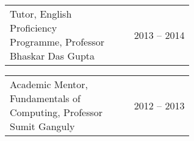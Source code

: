 \documentclass[a4paper]{article} %
\newcommand{\verticalspacing}{-0.25cm}
\newcommand{\headspace}{-0.3cm}
\newcommand{\bulletspace}{0.7cm}
\newcommand{\projectheadspacing}{6.9cm}
\newcommand{\cproject}[5]{%
    \begin{tabular}{p{0.60\linewidth}r}
        \textcolor{NavyBlue}{\small #2} & \multicolumn{1}{m{ \projectheadspacing{} }}{\raggedleft \small {\textsc{#1}}}\\
        \small {#3} & \small {#4}
    \end{tabular}\\
    \begin{tabular}{p{0.98\linewidth}}
    \vspace{-0.3cm}
        \small{#5}
    \end{tabular}
    \vspace{\verticalspacing{}}
}
\newcommand{\gitproject}[3]{%
    \begin{tabular}{p{0.60\linewidth}r}
        \textcolor{NavyBlue}{\small #2} & \multicolumn{1}{m{ \projectheadspacing{} }}{\raggedleft #1}\\
    \end{tabular}\\
    \begin{tabular}{p{0.98\linewidth}}
        \vspace{\headspace{}}
        \small{#3}
    \end{tabular}
    \vspace{\verticalspacing{}}
    \vspace{-0.2cm} %
}
\newcommand{\skill}[2]{%
    \begin{tabular}{p{0.60\linewidth}r}
        \small {#2} & \multicolumn{1}{m{ \projectheadspacing{} }}{\raggedleft \textsc{\small #1}}\\
    \end{tabular}
    \vspace{\verticalspacing{}}
}
\begin{document}
\skill
    {2013 -- 2014}
    {Tutor, English Proficiency Programme, Professor Bhaskar Das Gupta}


\skill
    {2012 -- 2013}
    {Academic Mentor, Fundamentals of Computing, Professor Sumit Ganguly}


%
%
%
\end{document}
